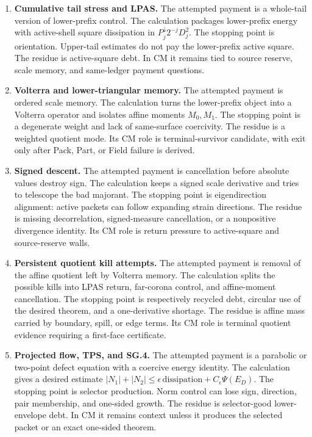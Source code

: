 \begin{enumerate}[leftmargin=*,label=\arabic*.]
\item \textbf{Cumulative tail stress and LPAS.}
The attempted payment is a whole-tail version of lower-prefix control.
The calculation packages lower-prefix energy with active-shell square
dissipation in \(P_j^\downarrow2^{-j}D_j^2\).
The stopping point is orientation.
Upper-tail estimates do not pay the lower-prefix active square.
The residue is active-square debt.  In CM it remains tied to source reserve,
scale memory, and same-ledger payment questions.

\item \textbf{Volterra and lower-triangular memory.}
The attempted payment is ordered scale memory.
The calculation turns the lower-prefix object into a Volterra operator and
isolates affine moments \(M_0,M_1\).
The stopping point is a degenerate weight and lack of same-surface coercivity.
The residue is a weighted quotient mode.
Its CM role is terminal-survivor candidate, with exit only after Pack, Part, or
Field failure is derived.

\item \textbf{Signed descent.}
The attempted payment is cancellation before absolute values destroy sign.
The calculation keeps a signed scale derivative and tries to telescope the bad
majorant.
The stopping point is eigendirection alignment: active packets can follow
expanding strain directions.
The residue is missing decorrelation, signed-measure cancellation, or a
nonpositive divergence identity.
Its CM role is return pressure to active-square and source-reserve walls.

\item \textbf{Persistent quotient kill attempts.}
The attempted payment is removal of the affine quotient left by Volterra
memory.
The calculation splits the possible kills into LPAS return, far-corona
control, and affine-moment cancellation.
The stopping point is respectively recycled debt, circular use of the desired
theorem, and a one-derivative shortage.
The residue is affine mass carried by boundary, spill, or edge terms.
Its CM role is terminal quotient evidence requiring a first-face certificate.

\item \textbf{Projected flow, TPS, and SG.4.}
The attempted payment is a parabolic or two-point defect equation with a
coercive energy identity.
The calculation gives a desired estimate
\(|N_1|+|N_2|\le\epsilon\,\mathrm{dissipation}+C_\epsilon\Psi(E_D)\).
The stopping point is selector production.
Norm control can lose sign, direction, pair membership, and one-sided growth.
The residue is selector-good lower-envelope debt.  In CM it remains context
unless it produces the selected packet or an exact one-sided theorem.


\end{enumerate}
